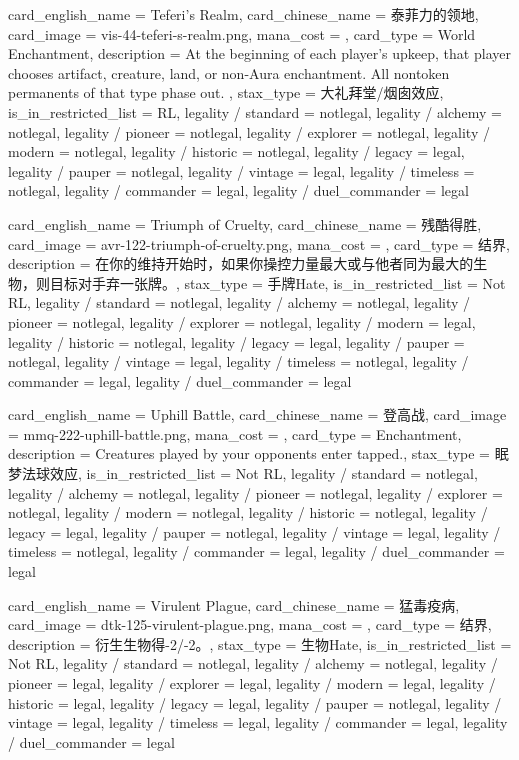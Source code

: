 \documentclass[lang = cn, color = black, 10pt]{AllThatStax}
\begin{document}
\card
{
	card_english_name = {Teferi's Realm},
	card_chinese_name = {泰菲力的领地},
	card_image = vis-44-teferi-s-realm.png,
	mana_cost = ,
	card_type = World Enchantment,
	description = {At the beginning of each player's upkeep, that player chooses artifact, creature, land, or non-Aura enchantment. All nontoken permanents of that type phase out. },
	stax_type = 大礼拜堂/烟囱效应,
	is_in_restricted_list = RL,
	legality / standard = notlegal,
	legality / alchemy = notlegal,
	legality / pioneer = notlegal,
	legality / explorer = notlegal,
	legality / modern = notlegal,
	legality / historic = notlegal,
	legality / legacy = legal,
	legality / pauper = notlegal,
	legality / vintage = legal,
	legality / timeless = notlegal,
	legality / commander = legal,
	legality / duel_commander = legal
}

\card
{
	card_english_name = {Triumph of Cruelty},
	card_chinese_name = {残酷得胜},
	card_image = avr-122-triumph-of-cruelty.png,
	mana_cost = ,
	card_type = 结界,
	description = {在你的维持开始时，如果你操控力量最大或与他者同为最大的生物，则目标对手弃一张牌。},
	stax_type = 手牌Hate,
	is_in_restricted_list = Not RL,
	legality / standard = notlegal,
	legality / alchemy = notlegal,
	legality / pioneer = notlegal,
	legality / explorer = notlegal,
	legality / modern = legal,
	legality / historic = notlegal,
	legality / legacy = legal,
	legality / pauper = notlegal,
	legality / vintage = legal,
	legality / timeless = notlegal,
	legality / commander = legal,
	legality / duel_commander = legal
}

\card
{
	card_english_name = {Uphill Battle},
	card_chinese_name = {登高战},
	card_image = mmq-222-uphill-battle.png,
	mana_cost = ,
	card_type = Enchantment,
	description = {Creatures played by your opponents enter tapped.},
	stax_type = 眠梦法球效应,
	is_in_restricted_list = Not RL,
	legality / standard = notlegal,
	legality / alchemy = notlegal,
	legality / pioneer = notlegal,
	legality / explorer = notlegal,
	legality / modern = notlegal,
	legality / historic = notlegal,
	legality / legacy = legal,
	legality / pauper = notlegal,
	legality / vintage = legal,
	legality / timeless = notlegal,
	legality / commander = legal,
	legality / duel_commander = legal
}

\card
{
	card_english_name = {Virulent Plague},
	card_chinese_name = {猛毒疫病},
	card_image = dtk-125-virulent-plague.png,
	mana_cost = ,
	card_type = 结界,
	description = {衍生生物得-2/-2。},
	stax_type = 生物Hate,
	is_in_restricted_list = Not RL,
	legality / standard = notlegal,
	legality / alchemy = notlegal,
	legality / pioneer = legal,
	legality / explorer = legal,
	legality / modern = legal,
	legality / historic = legal,
	legality / legacy = legal,
	legality / pauper = notlegal,
	legality / vintage = legal,
	legality / timeless = legal,
	legality / commander = legal,
	legality / duel_commander = legal
}
\end{document}
